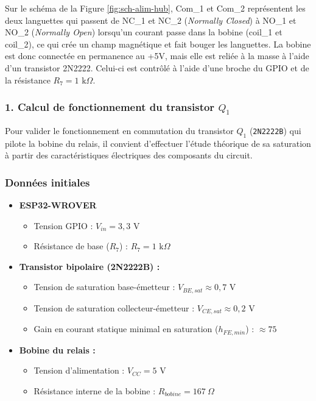 Sur le schéma de la Figure \ref{fig:sch-alim-hub}, Com\_1 et Com\_2 représentent les deux languettes 
qui passent de NC\_1 et NC\_2 (\textit{Normally Closed}) à NO\_1 et NO\_2 (\textit{Normally Open}) lorsqu'un courant passe dans la 
bobine (coil\_1 et coil\_2), ce qui crée un champ magnétique et fait bouger les languettes.
La bobine est donc connectée en permanence au +5V, mais elle est reliée à la masse à l'aide d'un 
transistor 2N2222.
Celui-ci est contrôlé à l'aide d'une broche du GPIO et de la résistance $R_7 = 1\text{ k}\Omega$.  

\subsubsection*{1. Calcul de fonctionnement du transistor $Q_1$}

Pour valider le fonctionnement en commutation du transistor $Q_1$ (\texttt{2N2222B}) qui pilote la bobine du relais, 
il convient d'effectuer l'étude théorique de sa saturation à partir des caractéristiques électriques des composants du circuit.

\subsubsection*{Données initiales}
\begin{itemize}
    \item \textbf{ESP32-WROVER} 
    \begin{itemize}
        \item Tension GPIO : $V_{in} = 3{,}3\text{ V}$
        \item Résistance de base ($R_7$) : $R_7 = 1\text{ k}\Omega$
    \end{itemize}
    \item \textbf{Transistor bipolaire (2N2222B) :}
    \begin{itemize}
        \item Tension de saturation base-émetteur : $V_{BE,sat} \approx 0{,}7\text{ V}$
        \item Tension de saturation collecteur-émetteur : $V_{CE,sat} \approx 0{,}2\text{ V}$
        \item Gain en courant statique minimal en saturation ($h_{FE,min}$) : $\approx 75$
    \end{itemize}
    \item \textbf{Bobine du relais :}
    \begin{itemize}
        \item Tension d'alimentation : $V_{CC} = 5\text{ V}$
        \item Résistance interne de la bobine : $R_{bobine} = 167\ \Omega$
    \end{itemize}
\end{itemize}

